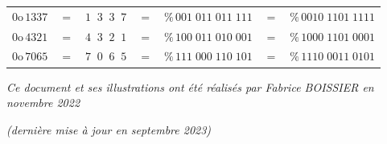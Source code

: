 \documentclass[11pt,a4paper]{article}
\begin{document}
\begin{tabular}{l c c c c c c}
$ 0\text{o} \, 1337 $  &  $ = $  & $ 1 \; \; 3 \; \;  3 \; \;  7 $ & $ = $ & $ \% \, 001 \; 011 \; 011 \; 111 $ &
                                                                     $ = $ & $ \% \, 0010 \; 1101 \; 1111 $  \\
$ 0\text{o} \, 4321 $  &  $ = $  & $ 4 \; \; 3 \; \;  2 \; \;  1 $ & $ = $ & $ \% \, 100 \; 011 \; 010 \; 001 $ &
                                                                     $ = $ & $ \% \, 1000 \; 1101 \; 0001 $  \\
$ 0\text{o} \, 7065 $  &  $ = $  & $ 7 \; \; 0 \; \;  6 \; \;  5 $ & $ = $ & $ \% \, 111 \; 000 \; 110 \; 101 $ &
                                                                     $ = $ & $ \% \, 1110 \; 0011 \; 0101 $  \\
\end{tabular}

\bigskip



\vfillFirst

\vfillLast

\begin{center}
\textit{Ce document et ses illustrations ont été réalisés par Fabrice BOISSIER en novembre 2022}

\textit{(dernière mise à jour en septembre 2023)}
\end{center}
\end{document}
